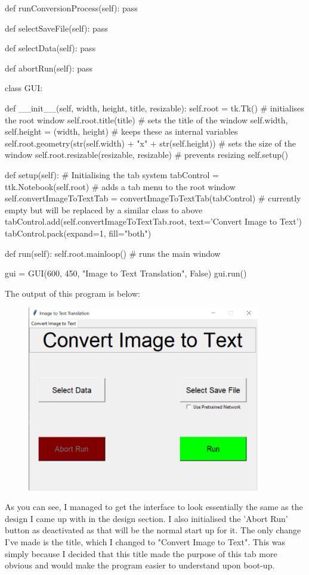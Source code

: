 \documentclass{report}
\begin{document}
\begin{python}
    def runConversionProcess(self):
        pass

    def selectSaveFile(self):
        pass

    def selectData(self):
        pass

    def abortRun(self):
        pass

class GUI:

    def __init__(self, width, height, title, resizable):
        self.root = tk.Tk()  # initialises the root window
        self.root.title(title)  # sets the title of the window
        self.width, self.height = (width, height)  # keeps these as internal variables
        self.root.geometry(str(self.width) + "x" + str(self.height))  # sets the size of the window
        self.root.resizable(resizable, resizable)  # prevents resizing
        self.setup()

    def setup(self):
        # Initialising the tab system
        tabControl = ttk.Notebook(self.root)  # adds a tab menu to the root window
        self.convertImageToTextTab = convertImageToTextTab(tabControl)  # currently empty but will be replaced by a similar class to above
        tabControl.add(self.convertImageToTextTab.root, text='Convert Image to Text')
        tabControl.pack(expand=1, fill="both")

    def run(self):
        self.root.mainloop()  # runs the main window


gui = GUI(600, 450, "Image to Text Translation", False)
gui.run()
\end{python}
The output of this program is below:
\begin{figure}[H]
    \centering
    \includegraphics[width=4in]{Images/Development and Testing/Stage 7/Image to Text Conversion Tab/Test 1.png}
    \label{fig:Test 1 Tab creation}
\end{figure}
\noindent As you  can see, I managed to get the interface to look essentially the same as the design I came up with in the design section. I also initialised the 'Abort Run' button as deactivated as that will be the normal start up for it. The only change I've made is the title, which I changed to "Convert Image to Text". This was simply because I decided that this title made the purpose of this tab more obvious and would make the program easier to understand upon boot-up.
\end{document}
